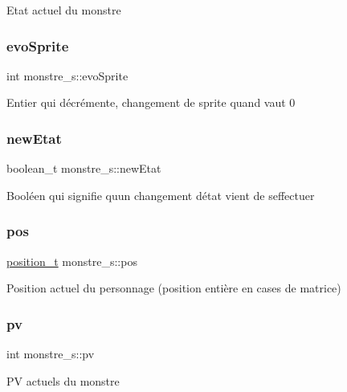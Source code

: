 Etat actuel du monstre \mbox{\label{structmonstre__s_a3815defb3b0db5e3b9fc71b77ddabeca}} 
\subsubsection{\texorpdfstring{evo\+Sprite}{evoSprite}}
{\footnotesize\ttfamily int monstre\+\_\+s\+::evo\+Sprite}

Entier qui décrémente, changement de sprite quand vaut 0 \mbox{\label{structmonstre__s_a137937d4822ae2db1615ceeae7209e10}} 
\subsubsection{\texorpdfstring{new\+Etat}{newEtat}}
{\footnotesize\ttfamily boolean\+\_\+t monstre\+\_\+s\+::new\+Etat}

Booléen qui signifie qu\textquotesingle{}un changement d\textquotesingle{}état vient de s\textquotesingle{}effectuer \mbox{\label{structmonstre__s_a972c2fb3087127d04bd3719d62c1030e}} 
\subsubsection{\texorpdfstring{pos}{pos}}
{\footnotesize\ttfamily \hyperlink{structposition__s}{position\+\_\+t} monstre\+\_\+s\+::pos}

Position actuel du personnage (position entière en cases de matrice) \mbox{\label{structmonstre__s_a1e26c0e85b90352f9496f331ec74e98d}} 
\subsubsection{\texorpdfstring{pv}{pv}}
{\footnotesize\ttfamily int monstre\+\_\+s\+::pv}

PV actuels du monstre \mbox{\label{structmonstre__s_a7c57e6c890e0709f09b1df09c71a8daa}} 
